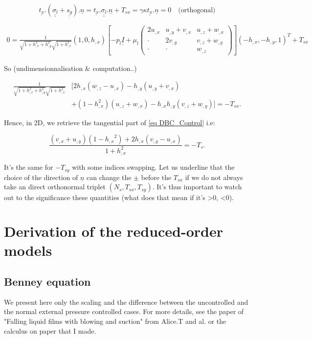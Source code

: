 \documentclass[12pt]{article}
\begin{document}
$$\underline{t_x}.(\underline{\underline{\sigma_l}}+\underline{s_g}).\underline{n}= \underline{t_x}.\underline{\underline{\sigma_l}}.\underline{n}+T_{sx}=\gamma\kappa\underline{t_x}.\underline{n}=0 \quad \text{(orthogonal)}$$

\begin{align*}
0 = \frac{1}{\sqrt{1+h_{,x}^2+h_{,y}^2}\sqrt{1+h_{,x}^2}}(1, 0, h_{,x})\left[ -p_l\underline{\underline{I}} + \mu_l\begin{pmatrix}
2u_{,x} & u_{,y}+v_{,x} & u_{,z}+w_{,x} \\
\cdot & 2v_{,y} & v_{,z}+w_{,y} \\
\cdot & \cdot & w_{,z}
\end{pmatrix} \right](-h_{,x}, -h_{,y}, 1)^T+T_{sx}
\end{align*}

So (undimensionnalisation \& computation..)


\begin{align*}
    \frac{1}{\sqrt{1+h_{,x}^2+h_{,y}^2}\sqrt{1+h_{,x}^2}} &\Big[
        2h_{,x}(w_{,z}-u_{,x})-h_{,y}(u_{,y}+v_{,x})\\
    &+(1-h_{,x}^2)(u_{,z}+w_{,x}) -h_{,x}h_{,y}(v_{,z}+w_{,y}) \Big]
    = -T_{sx}.
\end{align*}


Hence, in 2D, we retrieve the tangential part of \eqref{eq DBC_Control} i.e: 

$$    \frac{(v_{,x} + u_{,y})(1-{h_{,x}}^2)+2h_{,x}(v_{,y}-u_{,x})}{1+h_{,x}^2}= -T_s. $$

It's the same for $-T_{sy}$ with some indices swapping. Let us underline that the choice of the direction of $\underline{n}$ can change the $\pm$ before the $T_{sx}$ if we do not always take an direct orthonormal triplet $(N_s, T_{sx}, T_{sy})$. It's thus important to watch out to the significance these quantities (what does that mean if it's >0, <0). 

\section{Derivation of the reduced-order models}
\subsection{Benney equation}
We present here only the scaling and the difference between the uncontrolled and the normal external pressure controlled cases. For more details, see the paper of "Falling liquid films with blowing and suction" from Alice.T and al. or the calculus on paper that I made. 
\end{document}
